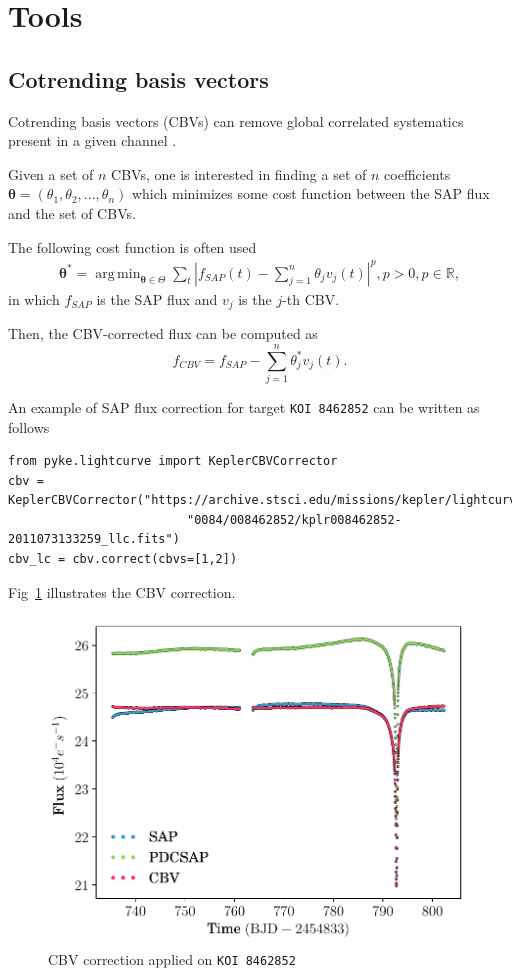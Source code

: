 \documentclass{article}
\DeclareMathOperator*{\argmin}{arg\,min}
\begin{document}
\section{Tools}

\subsection{Cotrending basis vectors}

Cotrending basis vectors (CBVs) can remove global correlated
systematics present in a given channel \cite{2012PASP..124.1000S}.

Given a set of $n$ CBVs, one is interested in finding a set of $n$
coefficients $\bm{\theta}=(\theta_1, \theta_2, ..., \theta_n)$ which minimizes
some cost function between the SAP flux and the set of CBVs.

The following cost function is often used
\begin{align}
    \bm{\theta}^{*} = \argmin_{\bm{\theta} \in \Theta} \sum_{t}|f_{SAP}(t)
    - \sum_{j=1}^{n}\theta_j v_{j}(t)|^p, p>0, p \in \mathbb{R},
\end{align}
in which $f_{SAP}$ is the SAP flux and $v_j$ is the $j$-th CBV.

Then, the CBV-corrected flux can be computed as
\begin{equation}
    f_{CBV} = f_{SAP} - \sum_{j=1}^{n}\theta^{*}_j v_{j}(t).
\end{equation}

An example of SAP flux correction for target \texttt{KOI 8462852}
can be written as follows
\begin{verbatim}
from pyke.lightcurve import KeplerCBVCorrector
cbv = KeplerCBVCorrector("https://archive.stsci.edu/missions/kepler/lightcurves/"
                         "0084/008462852/kplr008462852-2011073133259_llc.fits")
cbv_lc = cbv.correct(cbvs=[1,2])
\end{verbatim}

Fig~\ref{fig:cbv-correction} illustrates the CBV correction.
\begin{figure}[!htb]
    \centering
    \includegraphics[scale=.5]{figs/cbv.pdf}
    \caption{CBV correction applied on \texttt{KOI 8462852}}
    \label{fig:cbv-correction}
\end{figure}
\end{document}
